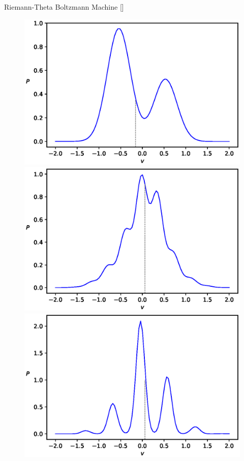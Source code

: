 \documentclass[10pt]{beamer}
\begin{document}
\begin{frame}{Riemann-Theta Boltzmann Machine \hfill \small [\cite{2020}]}
\begin{figure}
\begin{center}
          \includegraphics[scale=0.25]{figures/PvPhaseII-1}
          \includegraphics[scale=0.25]{figures/PvPhaseII-2}
          \includegraphics[scale=0.25]{figures/PvPhaseII-3} 
          \label{PvPlots}
        

\end{center}
\end{figure}
\end{frame}
\end{document}
